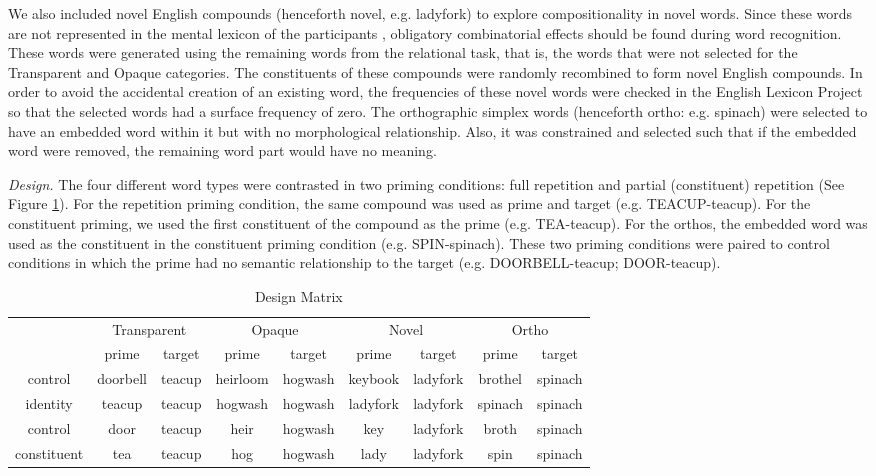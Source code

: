 \documentclass{frontiersSCNS}
\begin{document}
	We also included novel English compounds (henceforth novel, e.g. ladyfork) to explore compositionality in novel words.  Since these words are not represented in the mental lexicon of the participants  \citep{Libben:1998}, obligatory combinatorial effects should be found during word recognition. These words were generated using the remaining words from the relational task, that is, the words that were not selected for the Transparent and Opaque categories.  The constituents of these compounds were randomly recombined to form novel English compounds.  In order to avoid the accidental creation of an existing word, the frequencies of these novel words were checked in the English Lexicon Project \citep{Balota:2007} so that the selected words had a surface frequency of zero. The orthographic simplex words (henceforth ortho: e.g. spinach) were selected to have an embedded word within it but with no morphological relationship. Also, it was constrained and selected such that if the embedded word were removed, the remaining word part would have no meaning.
 
\textit{Design.}  The four different word types were contrasted in two priming conditions: full repetition and partial (constituent) repetition (See Figure \ref{tab:Design-Matrix}).  For the repetition priming condition, the same compound was used as prime and target (e.g. TEACUP-teacup). For the constituent priming, we used the first constituent of the compound as the prime (e.g. TEA-teacup). For the orthos, the embedded word was used as the constituent in the constituent priming condition (e.g. SPIN-spinach). These two priming conditions were paired to control conditions in which the prime had no semantic relationship to the target (e.g. DOORBELL-teacup; DOOR-teacup). 

\begin{table}
\begin{tabular}{|c||c|c||c|c||c|c||c|c|}
\hline 
\multicolumn{1}{|c||}{\multirow{}{}{}} & \multicolumn{2}{c||}{Transparent} & \multicolumn{2}{c||}{Opaque} & \multicolumn{2}{c||}{Novel} & \multicolumn{2}{c|}{Ortho}\tabularnewline
\cline{2-9} 
 & prime & target & prime & target & prime & target & prime & target\tabularnewline
\hline 
\hline 
control & doorbell & teacup & heirloom & hogwash & keybook & ladyfork & brothel & spinach\tabularnewline
\hline 
identity & teacup & teacup & hogwash & hogwash & ladyfork & ladyfork & spinach & spinach\tabularnewline
\hline 
\hline 
control & door & teacup & heir & hogwash & key & ladyfork & broth & spinach\tabularnewline
\hline 
constituent & tea & teacup & hog & hogwash & lady & ladyfork & spin & spinach\tabularnewline
\hline 
\end{tabular}\caption{\label{tab:Design-Matrix} Design Matrix}
\end{table}
\end{document}
